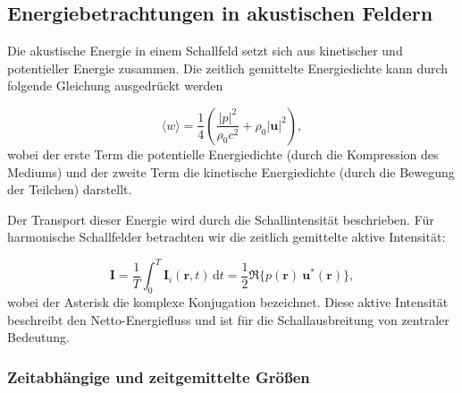  
 

\subsection{Energiebetrachtungen in akustischen Feldern
\label{helmholtz:subsection:Energiebetrachtung}}

Die akustische Energie in einem Schallfeld setzt sich aus kinetischer und potentieller Energie zusammen. Die zeitlich gemittelte Energiedichte kann durch folgende Gleichung ausgedrückt werden

\begin{equation}
\langle w \rangle = \frac{1}{4}\left(\frac{|p|^2}{\rho_0 c^2} + \rho_0 |\boldsymbol{u}|^2 \right),
\end{equation}
wobei der erste Term die potentielle Energiedichte (durch die Kompression des Mediums) und der zweite Term die kinetische Energiedichte (durch die Bewegung der Teilchen) darstellt.

Der Transport dieser Energie wird durch die Schallintensität beschrieben. Für harmonische Schallfelder betrachten wir die zeitlich gemittelte aktive Intensität:

\begin{equation}
\boldsymbol{I} = \frac{1}{T}\int_0^T \boldsymbol{I}_i(\boldsymbol{r},t)\,\mathrm{d}t = \frac{1}{2}\Re\{p(\boldsymbol{r})~\boldsymbol{u}^*(\boldsymbol{r})\},
\end{equation}
wobei der Asterisk die komplexe Konjugation bezeichnet. Diese aktive Intensität beschreibt den Netto-Energiefluss und ist für die Schallausbreitung von zentraler Bedeutung.

\subsubsection{Zeitabhängige und zeitgemittelte Größen}

